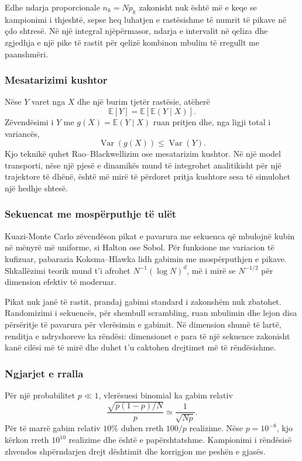 \documentclass[11pt,oneside,openany]{book}
\newcommand{\E}{\mathbb{E}}
\newcommand{\Var}{\operatorname{Var}}
\begin{document}
Edhe ndarja proporcionale $n_k=Np_k$ zakonisht nuk është më e keqe se kampionimi i thjeshtë, sepse heq luhatjen e rastësishme të numrit të pikave në çdo shtresë. Në një integral njëpërmasor, ndarja e intervalit në qeliza dhe zgjedhja e një pike të rastit për qelizë kombinon mbulim të rregullt me paanshmëri.

\subsubsection{Mesatarizimi kushtor}
Nëse $Y$ varet nga $X$ dhe një burim tjetër rastësie, atëherë
\begin{equation}
 \E[Y]=\E[\E(Y\mid X)].
\end{equation}
Zëvendësimi i $Y$ me $g(X)=\E(Y\mid X)$ ruan pritjen dhe, nga ligji total i variancës,
\begin{equation}
 \Var(g(X))\le\Var(Y).
\end{equation}
Kjo teknikë quhet Rao--Blackwellizim ose mesatarizim kushtor. Në një model transporti, nëse një pjesë e dinamikës mund të integrohet analitikisht për një trajektore të dhënë, është më mirë të përdoret pritja kushtore sesa të simulohet një hedhje shtesë.

\subsubsection{Sekuencat me mospërputhje të ulët}
Kuazi-Monte Carlo zëvendëson pikat e pavarura me sekuenca që mbulojnë kubin në mënyrë më uniforme, si Halton ose Sobol. Për funksione me variacion të kufizuar, pabarazia Koksma--Hlawka lidh gabimin me mospërputhjen e pikave. Shkallëzimi teorik mund t'i afrohet $N^{-1}(\log N)^d$, më i mirë se $N^{-1/2}$ për dimension efektiv të moderuar.

Pikat nuk janë të rastit, prandaj gabimi standard i zakonshëm nuk zbatohet. Randomizimi i sekuencës, për shembull scrambling, ruan mbulimin dhe lejon disa përsëritje të pavarura për vlerësimin e gabimit. Në dimension shumë të lartë, renditja e ndryshoreve ka rëndësi: dimensionet e para të një sekuence zakonisht kanë cilësi më të mirë dhe duhet t'u caktohen drejtimet më të rëndësishme.

\subsubsection{Ngjarjet e rralla}
Për një probabilitet $p\ll1$, vlerësuesi binomial ka gabim relativ
\begin{equation}
 \frac{\sqrt{p(1-p)/N}}{p}\simeq\frac{1}{\sqrt{Np}}.
\end{equation}
Për të marrë gabim relativ $10\%$ duhen rreth $100/p$ realizime. Nëse $p=10^{-8}$, kjo kërkon rreth $10^{10}$ realizime dhe është e papërshtatshme. Kampionimi i rëndësisë zhvendos shpërndarjen drejt dështimit dhe korrigjon me peshën e gjasës.
\end{document}
